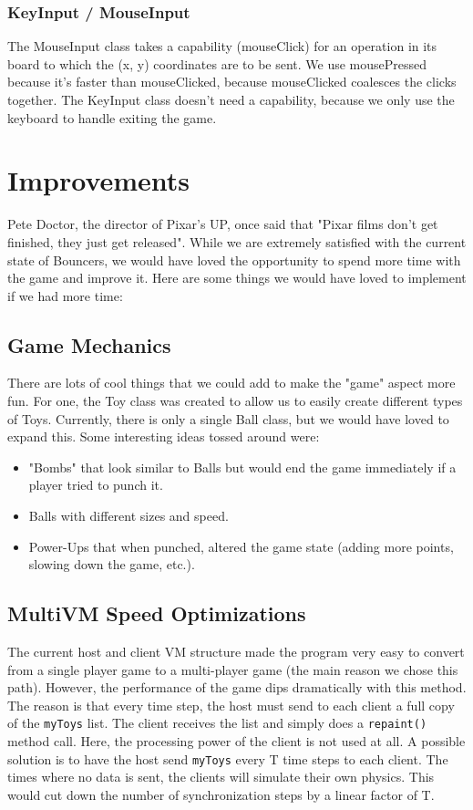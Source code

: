 \documentclass[11pt]{article}
\begin{document}
\subsubsection{KeyInput / MouseInput}
The MouseInput class takes a capability (mouseClick) for an operation in its 
board to which the (x, y) coordinates are to be sent.  We use mousePressed 
because it’s faster than mouseClicked, because mouseClicked coalesces the 
clicks together.  The KeyInput class doesn’t need a capability, because we 
only use the keyboard to handle exiting the game.


\section{Improvements}
Pete Doctor, the director of Pixar's UP, once said that "Pixar films don't get 
finished, they just get released".  While we are extremely satisfied with the 
current state of Bouncers, we would have loved the opportunity to spend more 
time with the game and improve it.  Here are some things we would have loved 
to implement if we had more time:

\subsection{Game Mechanics}
There are lots of cool things that we could add to make the "game" aspect more 
fun.  For one, the Toy class was created to allow us to easily create 
different types of Toys.  Currently, there is only a single Ball class, but we
would have loved to expand this. Some interesting ideas tossed around were:
\begin{itemize}
\item "Bombs" that look similar to Balls but would end the game immediately 
			if a player tried to punch it.
\item Balls with different sizes and speed.
\item Power-Ups that when punched, altered the game state (adding more points, 
			slowing down the game, etc.).
\end{itemize}

\subsection{Multi\-VM Speed Optimizations}
The current host and client VM structure made the program very easy
to convert from a single player game to a multi-player game (the main reason
we chose this path).  However, the performance of the game dips dramatically 
with this method.  The reason is that every time step, the host must send to
each client a full copy of the \texttt{myToys} list.  The client receives the
list and simply does a \texttt{repaint()} method call.  Here, the processing 
power of the client is not used at all.  A possible solution  is to have the 
host send \texttt{myToys} every T time steps to each client.  The times where 
no data is sent, the clients will simulate their own physics.  This would cut
down the number of synchronization steps by a linear factor of T.
\end{document}
